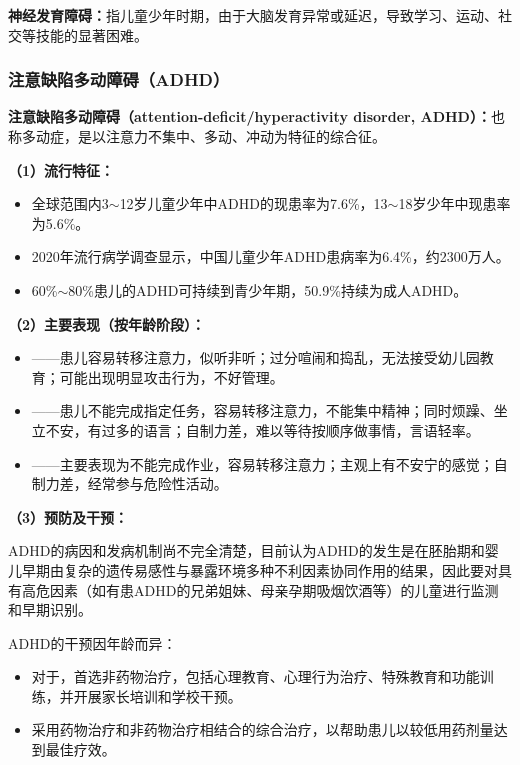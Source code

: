 \begin{defbox}
\textbf{神经发育障碍：}指儿童少年时期，由于大脑发育异常或延迟，导致学习、运动、社交等技能的显著困难。
\end{defbox}

\subsubsection{注意缺陷多动障碍（ADHD）}

\begin{keybox}
\textbf{注意缺陷多动障碍（attention-deficit/hyperactivity disorder, ADHD）：}也称多动症，是以注意力不集中、多动、冲动为特征的综合征。

\vspace{4pt}
\textbf{（1）流行特征：}

\begin{itemize}[leftmargin=*]
    \item 全球范围内3$\sim$12岁儿童少年中ADHD的现患率为7.6\%，13$\sim$18岁少年中现患率为5.6\%。
    \item 2020年流行病学调查显示，中国儿童少年ADHD患病率为6.4\%，约2300万人。
    \item 60\%$\sim$80\%患儿的ADHD可持续到青少年期，50.9\%持续为成人ADHD。
\end{itemize}

\vspace{4pt}
\textbf{（2）主要表现（按年龄阶段）：}

\begin{itemize}[leftmargin=*]
    \item {}——患儿容易转移注意力，似听非听；过分喧闹和捣乱，无法接受幼儿园教育；可能出现明显攻击行为，不好管理。
    \item {}——患儿不能完成指定任务，容易转移注意力，不能集中精神；同时烦躁、坐立不安，有过多的语言；自制力差，难以等待按顺序做事情，言语轻率。
    \item {}——主要表现为不能完成作业，容易转移注意力；主观上有不安宁的感觉；自制力差，经常参与危险性活动。
\end{itemize}

\vspace{4pt}
\textbf{（3）预防及干预：}

ADHD的病因和发病机制尚不完全清楚，目前认为ADHD的发生是在胚胎期和婴儿早期由复杂的遗传易感性与暴露环境多种不利因素协同作用的结果，因此要对具有高危因素（如有患ADHD的兄弟姐妹、母亲孕期吸烟饮酒等）的儿童进行监测和早期识别。

ADHD的干预因年龄而异：
\begin{itemize}[leftmargin=*]
    \item 对于，首选非药物治疗，包括心理教育、心理行为治疗、特殊教育和功能训练，并开展家长培训和学校干预。
    \item {}采用药物治疗和非药物治疗相结合的综合治疗，以帮助患儿以较低用药剂量达到最佳疗效。
\end{itemize}
\end{keybox}

